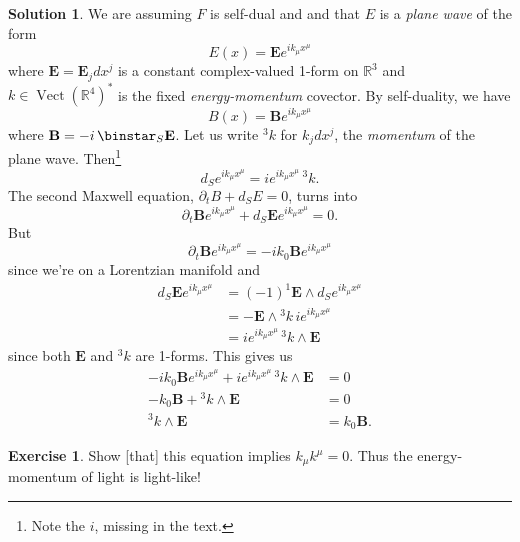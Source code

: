 \documentclass[11pt, a4paper]{report}
\theoremstyle{definition}
\newtheorem{exercise}{Exercise}[part]
\newtheorem{solution}{Solution}[part]
\newenvironment{ex}{\begin{exercise}}{\end{exercise}\pagebreak[1]}
\newenvironment{sol}{\begin{solution}}{\end{solution}\pagebreak[3]}
\newcommand*{\op}[1]{\ensuremath\mathop{}\mathopen{}#1}
\renewcommand*{\star}{\op{\binstar}\mathord{}}
\DeclareMathOperator{\Vect}{Vect}
\begin{document}
\begin{sol}

We are assuming $F$ is self-dual and and that $E$ is a \emph{plane wave} of the form
\[
    E(x) = \mathbf{E} e^{i k_\mu x^\mu}
\]
where $\mathbf{E} = \mathbf{E}_j dx^j$ is a constant complex-valued 1-form on $\mathbb{R}^3$
and $k \in {\Vect(\mathbb{R}^4)}^*$ is the fixed \emph{energy-momentum} covector.
By self-duality, we have
\[
    B(x) = \mathbf{B} e^{i k_\mu x^\mu}
\]
where $\mathbf{B} = -i \star_S \mathbf{E}$.
Let us write $^3 k$ for $k_j dx^j$, the \emph{momentum} of the plane wave.
Then\footnote{Note the $i$, missing in the text.}
\[
    d_S e^{i k_\mu x^\mu} = ie^{i k_\mu x^\mu} \, ^3 k.
\]
The second Maxwell equation, $\partial_t B + d_S E = 0$, turns into
\[
    \partial_t \mathbf{B} e^{i k_\mu x^\mu} + d_S \mathbf{E} e^{i k_\mu x^\mu} = 0.
\]
But
\[
    \partial_t \mathbf{B} e^{i k_\mu x^\mu} = -ik_0 \mathbf{B} e^{i k_\mu x^\mu}
\]
since we're on a Lorentzian manifold and
\begin{align*}
    d_S \mathbf{E} e^{i k_\mu x^\mu} &= {(-1)}^1 \mathbf{E} \wedge d_S e^{i k_\mu x^\mu} \\
        &= -\mathbf{E} \wedge {}^3 k \, i e^{i k_\mu x^\mu} \\
        &= i e^{i k_\mu x^\mu} \, ^3 k \wedge \mathbf{E}
\end{align*}
since both $\mathbf{E}$ and $^3 k$ are 1-forms.
This gives us
\begin{align*}
    -ik_0 \mathbf{B} e^{i k_\mu x^\mu} + i e^{i k_\mu x^\mu} \, ^3 k \wedge \mathbf{E} &= 0 \\
    -k_0 \mathbf{B} + {}^3 k \wedge \mathbf{E} &= 0 \\
    ^3 k \wedge \mathbf{E} &= k_0 \mathbf{B}.
\end{align*}

\end{sol}

\begin{ex}

Show [that] this equation implies $k_\mu k^\mu = 0$. Thus the energy-momentum of light is light-like!

\end{ex}
\end{document}
